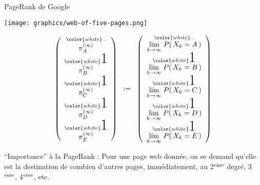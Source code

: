 
\begin{frame}{\Large PageRank de Google}

\begin{multicols}{2}

	\begin{minipage}{4.5cm}
	\begin{center}
	\vskip 0.75cm
	\texttt{[image: graphics/web-of-five-pages.png]}
	\end{center}
	\end{minipage}

\columnbreak

	\begin{flushleft}
	\begin{minipage}{4.0cm}
	\vskip -0.5cm
	\tiny
	\begin{equation*}
		\left(\begin{array}{c}
			\overset{{\color{white}\textnormal{          .}}}{\pi_{A}^{(\infty)}} \\
			\overset{{\color{white}\textnormal{\huge1}}}{\pi_{B}^{(\infty)}} \\
			\overset{{\color{white}\textnormal{\huge1}}}{\pi_{C}^{(\infty)}} \\
			\overset{{\color{white}\textnormal{\huge1}}}{\pi_{D}^{(\infty)}} \\
			\overset{{\color{white}\textnormal{\huge1}}}{\pi_{E}^{(\infty)}}
		\end{array}\right)
	\;\; := \;\;
		\left(\begin{array}{c}
			\overset{{\color{white}\textnormal{         .}}}{\underset{k\rightarrow\infty}{\lim}\; P(\,X_{k} = A\,)} \\
			\overset{{\color{white}\textnormal{\huge1}}}{\underset{k\rightarrow\infty}{\lim}\; P(\,X_{k} = B\,)} \\
			\overset{{\color{white}\textnormal{\huge1}}}{\underset{k\rightarrow\infty}{\lim}\; P(\,X_{k} = C\,)} \\
			\overset{{\color{white}\textnormal{\huge1}}}{\underset{k\rightarrow\infty}{\lim}\; P(\,X_{k} = D\,)} \\
			\overset{{\color{white}\textnormal{\huge1}}}{\underset{k\rightarrow\infty}{\lim}\; P(\,X_{k} = E\,)}
		\end{array}\right)
	\end{equation*}
	\end{minipage}
	\end{flushleft}

\end{multicols}

\vskip 0.3cm

\begin{center}
\pause\small ``Importance'' \`a la PageRank :
\vskip 0.2cm
\pause
\large Pour une page web donn\'ee, on se demand qu'elle est la {\color{customRed}destination de combien d'autres pages},
\vskip 0.1cm
\normalsize imm\'ediatement, au 2$^{\textnormal{eme}}$ degr\'e, 3$^{\textnormal{eme}}$, 4$^{\textnormal{eme}}$, etc.
\end{center}

\end{frame}
\normalsize

